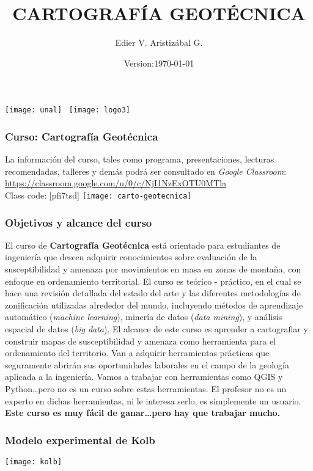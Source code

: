 \documentclass[12pt]{beamer}
\title[Introducción]{CARTOGRAFÍA GEOTÉCNICA}
\author[Edier Aristizábal]{Edier V. Aristizábal G.}
\institute{\emph{evaristizabalg@unal.edu.co}}
\date{Version:\today}
\begin{document}
\begin{frame}
\titlepage
\centering
\texttt{[image: unal]}\hspace*{4.75cm}~%
\texttt{[image: logo3]} 
\end{frame}
\begin{frame}
\frametitle{Curso: Cartografía Geotécnica}
\scriptsize{La información del curso, tales como programa, presentaciones, lecturas recomendadas, talleres y demás podrá ser consultado en \emph{Google Classroom}:}
\vfill
\centering
\url{https://classroom.google.com/u/0/c/NjI1NzExOTU0MTla}\\
Class code: [pfi7tsd]
\texttt{[image: carto-geotecnica]}
\end{frame}
\begin{frame}
\frametitle{Objetivos y alcance del curso}
\scriptsize{
\justifying
El curso de \textbf{Cartografía Geotécnica} está orientado para estudiantes de ingeniería que deseen  adquirir conocimientos sobre evaluación de la susceptibilidad y amenaza por movimientos en masa en zonas de montaña, con enfoque en ordenamiento territorial. 
\vfill
El curso es teórico - práctico, en el cual se hace una revisión detallada del estado del arte y las diferentes metodologías de zonificación utilizadas alrededor del mundo, incluyendo métodos de aprendizaje automático (\emph{machine learning}), minería de datos (\emph{data mining}), y análisis espacial de datos (\emph{big data}).
\vfill
El alcance de este curso es aprender a cartografiar y construir mapas de susceptibilidad y amenaza como herramienta para el ordenamiento del territorio.
\vfill
Van a adquirir herramientas prácticas que seguramente abrirán sus oportunidades laborales en el campo de la geología aplicada a la ingeniería.
\vfill
Vamos a trabajar con herramientas como QGIS y Python…pero no es un curso sobre estas herramientas. El profesor no es un experto en dichas herramientas,  ni le interesa serlo, es simplemente un usuario.
\vfill
\centering
\textbf{Este curso es muy fácil de ganar…pero hay que trabajar mucho.}

}
\end{frame}
\begin{frame}
\frametitle{Modelo experimental de Kolb}
\centering
\texttt{[image: kolb]}
\end{frame}
\end{document}
